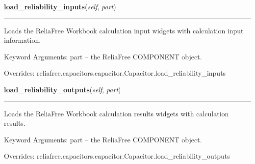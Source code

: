     \vspace{0.5ex}

\hspace{.8\funcindent}\begin{boxedminipage}{\funcwidth}

    \raggedright \textbf{load\_reliability\_inputs}(\textit{self}, \textit{part})

    \vspace{-1.5ex}

    \rule{\textwidth}{0.5\fboxrule}
\setlength{\parskip}{2ex}
    Loads the ReliaFree Workbook calculation input widgets with calculation
    input information.

    Keyword Arguments: part -- the ReliaFree COMPONENT object.

\setlength{\parskip}{1ex}
      Overrides: reliafree.capacitors.capacitor.Capacitor.load\_reliability\_inputs

    \end{boxedminipage}

    \vspace{0.5ex}

\hspace{.8\funcindent}\begin{boxedminipage}{\funcwidth}

    \raggedright \textbf{load\_reliability\_outputs}(\textit{self}, \textit{part})

    \vspace{-1.5ex}

    \rule{\textwidth}{0.5\fboxrule}
\setlength{\parskip}{2ex}
    Loads the ReliaFree Workbook calculation results widgets with 
    calculation results.

    Keyword Arguments: part -- the ReliaFree COMPONENT object.

\setlength{\parskip}{1ex}
      Overrides: reliafree.capacitors.capacitor.Capacitor.load\_reliability\_outputs

    \end{boxedminipage}

    \label{reliafree:capacitors:electrolytic:TantalumSolid:calculate_mil_217_count}

    \vspace{0.5ex}

